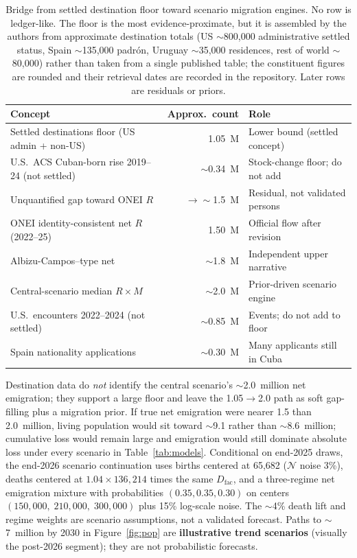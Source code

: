 \documentclass[11pt,a4paper]{article}
\begin{document}
\begin{table}[ht]
\centering
\caption{Bridge from settled destination floor toward scenario migration engines.
No row is ledger-like. The floor is the most evidence-proximate, but it is assembled by the authors from approximate destination totals (US $\sim$800{,}000 administrative settled status, Spain $\sim$135{,}000 padr{\'o}n, Uruguay $\sim$35{,}000 residences, rest of world $\sim$80{,}000) rather than taken from a single published table; the constituent figures are rounded and their retrieval dates are recorded in the repository. Later rows are residuals or priors.}
\label{tab:bridge}
\begin{tabular}{lrl}
\toprule
Concept & Approx.\ count & Role \\
\midrule
Settled destinations floor (US admin + non-US) & 1.05~M & Lower bound (settled concept) \\
U.S.\ ACS Cuban-born rise 2019--24 (not settled) & $\sim$0.34~M & Stock-change floor; do not add \\
Unquantified gap toward ONEI $R$ & $\to\sim$1.5~M & Residual, not validated persons \\
ONEI identity-consistent net $R$ (2022--25) & 1.50~M & Official flow after revision \\
Albizu-Campos--type net & $\sim$1.8~M & Independent upper narrative \\
Central-scenario median $R\times M$ & $\sim$2.0~M & Prior-driven scenario engine \\
U.S.\ encounters 2022--2024 (not settled) & $\sim$0.85~M & Events; do not add to floor \\
Spain nationality applications & $\sim$0.30~M & Many applicants still in Cuba \\
\bottomrule
\end{tabular}
\end{table}

Destination data do \emph{not} identify the central scenario's $\sim$2.0~million net emigration; they support a large floor and leave the 1.05$\to$2.0 path as soft gap-filling plus a migration prior.
If true net emigration were nearer 1.5 than 2.0~million, living population would sit toward $\sim$9.1 rather than $\sim$8.6~million; cumulative loss would remain large and emigration would still dominate absolute loss under every scenario in Table~\ref{tab:models}.
Conditional on end-2025 draws, the end-2026 scenario continuation uses births centered at 65{,}682 ($\mathcal{N}$ noise 3\%),
deaths centered at $1.04\times 136{,}214$ times the same $D_{\mathrm{fac}}$,
and a three-regime net emigration mixture with probabilities $(0.35,0.35,0.30)$ on centers $(150{,}000,\;210{,}000,\;300{,}000)$ plus 15\% log-scale noise.
The $\sim$4\% death lift and regime weights are scenario assumptions, not a validated forecast.
Paths to $\sim$7~million by 2030 in Figure~\ref{fig:pop} are \textbf{illustrative trend scenarios} (visually the post-2026 segment); they are not probabilistic forecasts.
\end{document}
